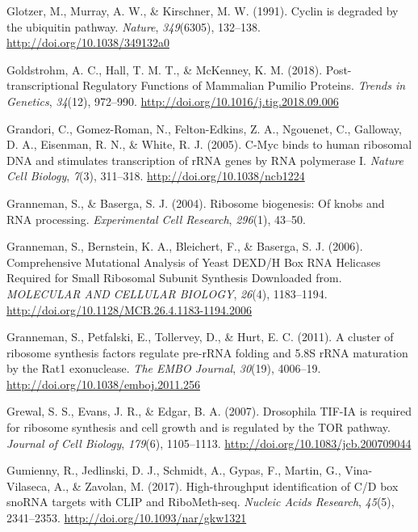 \documentclass[12pt,twoside]{reedthesis}
\newlength{\cslhangindent}
\newenvironment{cslreferences}%
  {\setlength{\parindent}{0pt}%
  \everypar{\setlength{\hangindent}{\cslhangindent}}\ignorespaces}%
  {\par}
\begin{document}
\begin{cslreferences}
\leavevmode\hypertarget{ref-glotzerCyclinDegradedUbiquitin1991}{}%
Glotzer, M., Murray, A. W., \& Kirschner, M. W. (1991). Cyclin is degraded by the ubiquitin pathway. \emph{Nature}, \emph{349}(6305), 132--138. \url{http://doi.org/10.1038/349132a0}

\leavevmode\hypertarget{ref-Goldstrohm2018c}{}%
Goldstrohm, A. C., Hall, T. M. T., \& McKenney, K. M. (2018). Post-transcriptional Regulatory Functions of Mammalian Pumilio Proteins. \emph{Trends in Genetics}, \emph{34}(12), 972--990. \url{http://doi.org/10.1016/j.tig.2018.09.006}

\leavevmode\hypertarget{ref-grandoriCMycBindsHuman2005}{}%
Grandori, C., Gomez-Roman, N., Felton-Edkins, Z. A., Ngouenet, C., Galloway, D. A., Eisenman, R. N., \& White, R. J. (2005). C-Myc binds to human ribosomal DNA and stimulates transcription of rRNA genes by RNA polymerase I. \emph{Nature Cell Biology}, \emph{7}(3), 311--318. \url{http://doi.org/10.1038/ncb1224}

\leavevmode\hypertarget{ref-Granneman2004a}{}%
Granneman, S., \& Baserga, S. J. (2004). Ribosome biogenesis: Of knobs and RNA processing. \emph{Experimental Cell Research}, \emph{296}(1), 43--50.

\leavevmode\hypertarget{ref-Granneman2006}{}%
Granneman, S., Bernstein, K. A., Bleichert, F., \& Baserga, S. J. (2006). Comprehensive Mutational Analysis of Yeast DEXD/H Box RNA Helicases Required for Small Ribosomal Subunit Synthesis Downloaded from. \emph{MOLECULAR AND CELLULAR BIOLOGY}, \emph{26}(4), 1183--1194. \url{http://doi.org/10.1128/MCB.26.4.1183-1194.2006}

\leavevmode\hypertarget{ref-Granneman2011}{}%
Granneman, S., Petfalski, E., Tollervey, D., \& Hurt, E. C. (2011). A cluster of ribosome synthesis factors regulate pre-rRNA folding and 5.8S rRNA maturation by the Rat1 exonuclease. \emph{The EMBO Journal}, \emph{30}(19), 4006--19. \url{http://doi.org/10.1038/emboj.2011.256}

\leavevmode\hypertarget{ref-Grewal2007c}{}%
Grewal, S. S., Evans, J. R., \& Edgar, B. A. (2007). Drosophila TIF-IA is required for ribosome synthesis and cell growth and is regulated by the TOR pathway. \emph{Journal of Cell Biology}, \emph{179}(6), 1105--1113. \url{http://doi.org/10.1083/jcb.200709044}

\leavevmode\hypertarget{ref-Gumienny2017c}{}%
Gumienny, R., Jedlinski, D. J., Schmidt, A., Gypas, F., Martin, G., Vina-Vilaseca, A., \& Zavolan, M. (2017). High-throughput identification of C/D box snoRNA targets with CLIP and RiboMeth-seq. \emph{Nucleic Acids Research}, \emph{45}(5), 2341--2353. \url{http://doi.org/10.1093/nar/gkw1321}


\end{cslreferences}
\end{document}
